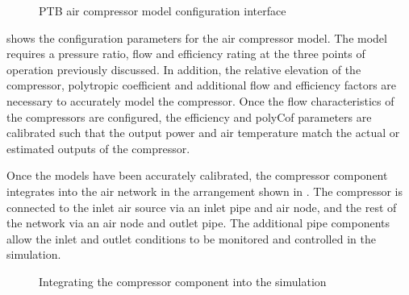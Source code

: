 		\par
		\begin{figure}[h]
			\centering
			\caption{PTB air compressor model configuration interface}
			\label{fig: CompressorInput}
		\end{figure}
		 shows the configuration parameters for the air compressor model. The model requires a pressure ratio, flow and efficiency rating at the three points of operation previously discussed. In addition, the relative elevation of the compressor, polytropic coefficient and additional flow and efficiency factors are necessary to accurately model the compressor. Once the flow characteristics of the compressors are configured, the efficiency and \gls{polyCof} parameters are calibrated such that the output power and air temperature match the actual or estimated outputs of the compressor.
		\par 
		Once the models have been accurately calibrated, the compressor component integrates into the air network in the arrangement shown in . The compressor is connected to the inlet air source via an inlet pipe and air node, and the rest of the network via an air node and outlet pipe. The additional pipe components allow the inlet and outlet conditions to be monitored and controlled in the simulation.
		\begin{figure}[h]
			\centering
			\caption{Integrating the compressor component into the simulation}
			\label{fig: Compressor models}
		\end{figure}		

